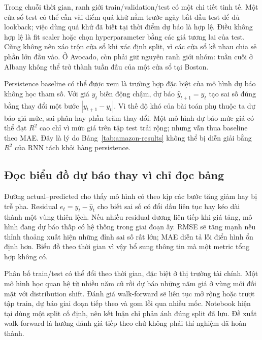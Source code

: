 \documentclass[12pt,a4paper]{report}
\begin{document}
Trong chuỗi thời gian, ranh giới train/validation/test có một chi tiết tinh tế. Một cửa sổ test có thể cần vài điểm quá khứ nằm trước ngày bắt đầu test để đủ lookback; việc dùng quá khứ đã biết tại thời điểm dự báo là hợp lệ. Điều không hợp lệ là fit scaler hoặc chọn hyperparameter bằng các giá tương lai của test. Cũng không nên xáo trộn cửa sổ khi xác định split, vì các cửa sổ kề nhau chia sẻ phần lớn đầu vào. Ở Avocado, còn phải giữ nguyên ranh giới nhóm: tuần cuối ở Albany không thể trở thành tuần đầu của một cửa sổ tại Boston.

Persistence baseline có thể được xem là trường hợp đặc biệt của mô hình dự báo không học tham số. Với giá $y_t$ biến động chậm, dự báo $\hat y_{t+1}=y_t$ tạo sai số đúng bằng thay đổi một bước $|y_{t+1}-y_t|$. Vì thế độ khó của bài toán phụ thuộc ta dự báo giá mức, sai phân hay phần trăm thay đổi. Một mô hình dự báo mức giá có thể đạt $R^2$ cao chỉ vì mức giá trên tập test trải rộng; nhưng vẫn thua baseline theo MAE. Đây là lý do Bảng~\ref{tab:amazon-results} không thể bị diễn giải bằng $R^2$ của RNN tách khỏi hàng persistence.

\subsection{Đọc biểu đồ dự báo thay vì chỉ đọc bảng}
Đường actual--predicted cho thấy mô hình có theo kịp các bước tăng giảm hay bị trễ pha. Residual $e_t=y_t-\hat y_t$ cho biết sai số có đổi dấu liên tục hay kéo dài thành một vùng thiên lệch. Nếu nhiều residual dương liên tiếp khi giá tăng, mô hình đang dự báo thấp có hệ thống trong giai đoạn ấy. RMSE sẽ tăng mạnh nếu thỉnh thoảng xuất hiện những đỉnh sai số rất lớn; MAE diễn tả lỗi điển hình ổn định hơn. Biểu đồ theo thời gian vì vậy bổ sung thông tin mà một metric tổng hợp không có.

Phân bố train/test có thể đổi theo thời gian, đặc biệt ở thị trường tài chính. Một mô hình học quan hệ từ nhiều năm cũ rồi dự báo những năm giá ở vùng mới đối mặt với distribution shift. Đánh giá walk-forward sẽ liên tục mở rộng hoặc trượt tập train, dự báo giai đoạn tiếp theo và gom lỗi qua nhiều mốc. Notebook hiện tại dùng một split cố định, nên kết luận chỉ phản ánh đúng split đã lưu. Đề xuất walk-forward là hướng đánh giá tiếp theo chứ không phải thí nghiệm đã hoàn thành.
\end{document}
